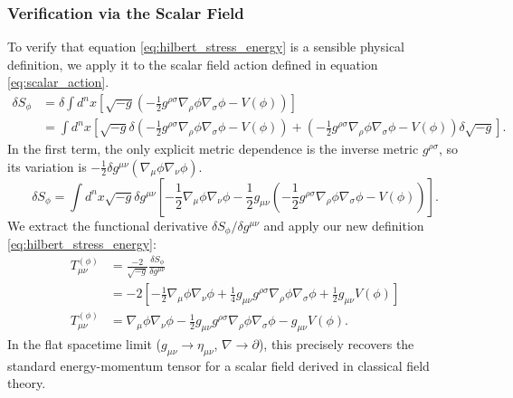 \documentclass[11pt, a4paper]{report}
\begin{document}
\subsubsection*{Verification via the Scalar Field}
To verify that equation \eqref{eq:hilbert_stress_energy} is a sensible physical definition, we apply it to the scalar field action defined in equation \eqref{eq:scalar_action}. %
\begin{align}
\delta S_{\phi} &= \delta \int d^{n}x \left[ \sqrt{-g} \left( -\frac{1}{2}g^{\rho\sigma}\nabla_{\rho}\phi\nabla_{\sigma}\phi - V(\phi) \right) \right] \nonumber \\
&= \int d^{n}x \left[ \sqrt{-g} \delta \left( -\frac{1}{2}g^{\rho\sigma}\nabla_{\rho}\phi\nabla_{\sigma}\phi - V(\phi) \right) + \left( -\frac{1}{2}g^{\rho\sigma}\nabla_{\rho}\phi\nabla_{\sigma}\phi - V(\phi) \right) \delta\sqrt{-g} \right].
\end{align}
In the first term, the only explicit metric dependence is the inverse metric $g^{\rho\sigma}$, so its variation is $-\frac{1}{2}\delta g^{\mu\nu}(\nabla_{\mu}\phi\nabla_{\nu}\phi)$. %
\begin{equation}
\delta S_{\phi} = \int d^{n}x \sqrt{-g} \delta g^{\mu\nu} \left[ -\frac{1}{2}\nabla_{\mu}\phi\nabla_{\nu}\phi - \frac{1}{2}g_{\mu\nu} \left( -\frac{1}{2}g^{\rho\sigma}\nabla_{\rho}\phi\nabla_{\sigma}\phi - V(\phi) \right) \right]. %
\end{equation}
We extract the functional derivative $\delta S_{\phi} / \delta g^{\mu\nu}$ and apply our new definition \eqref{eq:hilbert_stress_energy}:
\begin{align}
T^{(\phi)}_{\mu\nu} &= \frac{-2}{\sqrt{-g}} \frac{\delta S_{\phi}}{\delta g^{\mu\nu}} \nonumber \\
&= -2 \left[ -\frac{1}{2}\nabla_{\mu}\phi\nabla_{\nu}\phi + \frac{1}{4}g_{\mu\nu}g^{\rho\sigma}\nabla_{\rho}\phi\nabla_{\sigma}\phi + \frac{1}{2}g_{\mu\nu}V(\phi) \right] \nonumber \\
T^{(\phi)}_{\mu\nu} &= \nabla_{\mu}\phi\nabla_{\nu}\phi - \frac{1}{2}g_{\mu\nu}g^{\rho\sigma}\nabla_{\rho}\phi\nabla_{\sigma}\phi - g_{\mu\nu}V(\phi). %
\end{align}
In the flat spacetime limit ($g_{\mu\nu} \to \eta_{\mu\nu}$, $\nabla \to \partial$), this precisely recovers the standard energy-momentum tensor for a scalar field derived in classical field theory. %
\end{document}
